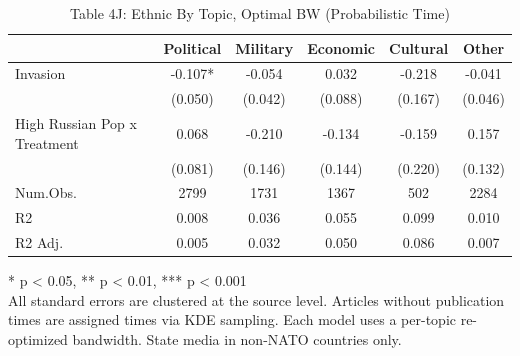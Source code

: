 \begin{table}[!t]
\caption{Table 4J: Ethnic By Topic, Optimal BW (Probabilistic Time)} 
\fontsize{12.0pt}{14.4pt}\selectfont
\begin{tabular*}{\linewidth}{@{\extracolsep{\fill}}lccccc}
\toprule
  & Political & Military & Economic & Cultural & Other \\ 
\midrule\addlinespace[2.5pt]
Invasion & -0.107* & -0.054 & 0.032 & -0.218 & -0.041 \\ 
 & (0.050) & (0.042) & (0.088) & (0.167) & (0.046) \\ 
High Russian Pop x Treatment & 0.068 & -0.210 & -0.134 & -0.159 & 0.157 \\ 
{} & {(0.081)} & {(0.146)} & {(0.144)} & {(0.220)} & {(0.132)} \\ 
Num.Obs. & 2799 & 1731 & 1367 & 502 & 2284 \\ 
R2 & 0.008 & 0.036 & 0.055 & 0.099 & 0.010 \\ 
R2 Adj. & 0.005 & 0.032 & 0.050 & 0.086 & 0.007 \\ 
\bottomrule
\end{tabular*}
\begin{minipage}{\linewidth}
* p < 0.05, ** p < 0.01, *** p < 0.001\\
All standard errors are clustered at the source level. Articles without
publication times are assigned times via KDE sampling. Each model uses a
per-topic re-optimized bandwidth. State media in non-NATO countries only.\\
\end{minipage}
\end{table}

